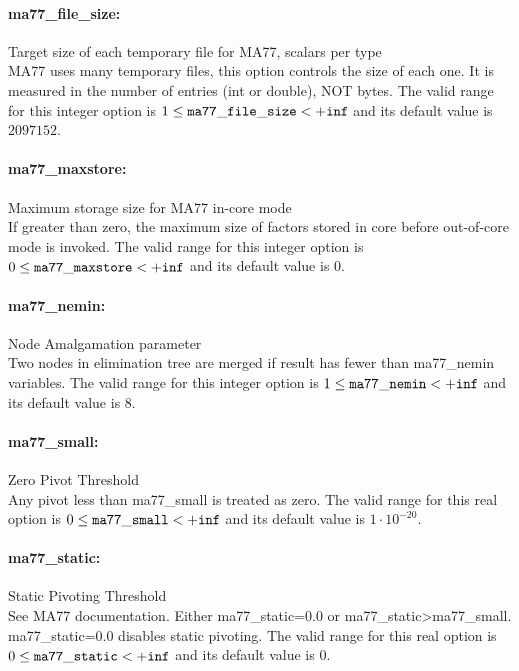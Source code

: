 \paragraph{ma77\_file\_size:}\label{opt:ma77_file_size} Target size of each temporary file for MA77, scalars per type \\
 MA77 uses many temporary files, this option
controls the size of each one. It is measured in
the number of entries (int or double), NOT bytes. The valid range for this integer option is
$1 \le {\tt ma77\_file\_size } <  {\tt +inf}$
and its default value is $2097152$.


\paragraph{ma77\_maxstore:}\label{opt:ma77_maxstore} Maximum storage size for MA77 in-core mode \\
 If greater than zero, the maximum size of factors
stored in core before out-of-core mode is invoked. The valid range for this integer option is
$0 \le {\tt ma77\_maxstore } <  {\tt +inf}$
and its default value is $0$.


\paragraph{ma77\_nemin:}\label{opt:ma77_nemin} Node Amalgamation parameter \\
 Two nodes in elimination tree are merged if
result has fewer than ma77\_nemin variables. The valid range for this integer option is
$1 \le {\tt ma77\_nemin } <  {\tt +inf}$
and its default value is $8$.


\paragraph{ma77\_small:}\label{opt:ma77_small} Zero Pivot Threshold \\
 Any pivot less than ma77\_small is treated as
zero. The valid range for this real option is 
$0 \le {\tt ma77\_small } <  {\tt +inf}$
and its default value is $1 \cdot 10^{-20}$.


\paragraph{ma77\_static:}\label{opt:ma77_static} Static Pivoting Threshold \\
 See MA77 documentation. Either ma77\_static=0.0
or ma77\_static>ma77\_small. ma77\_static=0.0
disables static pivoting. The valid range for this real option is 
$0 \le {\tt ma77\_static } <  {\tt +inf}$
and its default value is $0$.


